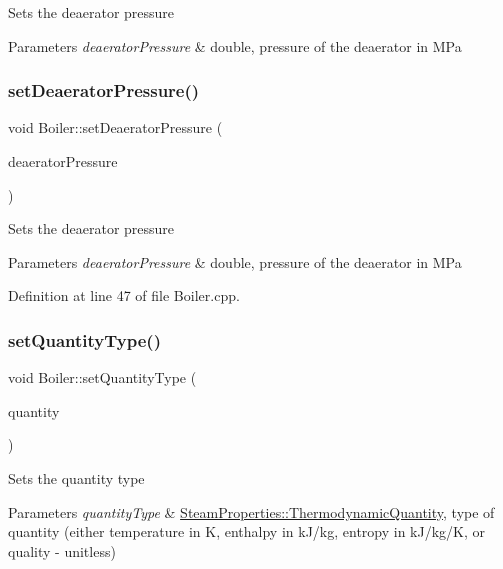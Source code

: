 Sets the deaerator pressure 
\begin{DoxyParams}{Parameters}
{\em deaerator\+Pressure} & double, pressure of the deaerator in M\+Pa \\
\hline
\end{DoxyParams}
\mbox{\label{class_boiler_a56f422254606ebba1248ae0b4f8f0215}} 
\subsubsection{\texorpdfstring{set\+Deaerator\+Pressure()}{setDeaeratorPressure()}\hspace{0.1cm}{\footnotesize\ttfamily [3/3]}}
{\footnotesize\ttfamily void Boiler\+::set\+Deaerator\+Pressure (\begin{DoxyParamCaption}\item[{double}]{deaerator\+Pressure }\end{DoxyParamCaption})}

Sets the deaerator pressure 
\begin{DoxyParams}{Parameters}
{\em deaerator\+Pressure} & double, pressure of the deaerator in M\+Pa \\
\hline
\end{DoxyParams}


Definition at line 47 of file Boiler.\+cpp.

\mbox{\label{class_boiler_a9c5b20cae6133c9174b12760f36d52c2}} 
\subsubsection{\texorpdfstring{set\+Quantity\+Type()}{setQuantityType()}\hspace{0.1cm}{\footnotesize\ttfamily [1/3]}}
{\footnotesize\ttfamily void Boiler\+::set\+Quantity\+Type (\begin{DoxyParamCaption}\item[{\hyperlink{class_steam_properties_ae0294bedf7d178c2d8fb6aed0f62fbff}{Steam\+Properties\+::\+Thermodynamic\+Quantity}}]{quantity }\end{DoxyParamCaption})}

Sets the quantity type 
\begin{DoxyParams}{Parameters}
{\em quantity\+Type} & \hyperlink{class_steam_properties_ae0294bedf7d178c2d8fb6aed0f62fbff}{Steam\+Properties\+::\+Thermodynamic\+Quantity}, type of quantity (either temperature in K, enthalpy in k\+J/kg, entropy in k\+J/kg/K, or quality -\/ unitless) \\
\hline
\end{DoxyParams}


